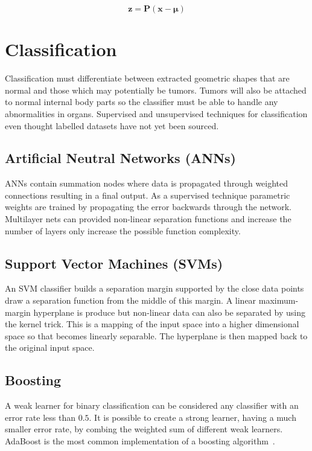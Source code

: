 \documentclass[journal]{IEEEtran}
\begin{document}
\begin{equation}
	\boldsymbol{z} = \boldsymbol{P}(\boldsymbol{x} - \boldsymbol{\mu})
	\label{eqn:PCA}
\end{equation}












\section{Classification}
\label{sec:class}

Classification must differentiate between extracted geometric shapes that are normal and those which may potentially be tumors.
Tumors will also be attached to normal internal body parts so the classifier must be able to handle any abnormalities in organs.
Supervised and unsupervised techniques for classification even thought labelled datasets have not yet been sourced.


\subsection{Artificial Neutral Networks (ANNs)}
ANNs contain summation nodes where data is propagated through weighted connections resulting in a final output. 
As a supervised technique parametric weights are trained by propagating the error backwards through the network.
Multilayer nets can provided non-linear separation functions and increase the number of layers only increase the possible function complexity.



\subsection{Support Vector Machines (SVMs)}
An SVM classifier builds a separation margin supported by the close data points draw a separation function from the middle of this margin.
A linear maximum-margin hyperplane is produce but non-linear data can also be separated by using the kernel trick. 
This is a mapping of the input space into a higher dimensional space so that becomes linearly separable.
The hyperplane is then mapped back to the original input space.



\subsection{Boosting}
A weak learner for binary classification can be considered any classifier with an error rate less than $0.5$.
It is possible to create a strong learner, having a much smaller error rate, by combing the weighted sum of different weak learners. 
AdaBoost is the most common implementation of a boosting algorithm~\cite{freund99boost}.
\end{document}
